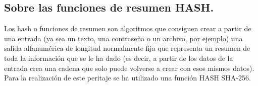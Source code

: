 \subsection{Sobre las funciones de resumen HASH.}
Los hash o funciones de resumen son algoritmos que consiguen crear a partir de una entrada (ya sea un texto, una contraseña o un archivo, por ejemplo) una salida alfanumérica de longitud normalmente fija que representa un resumen de toda la información que se le ha dado (es decir, a partir de los datos de la entrada crea una cadena que solo puede volverse a crear con esos mismos datos). Para la realización de este peritaje se ha utilizado una función HASH SHA-256.
%
%
%
%
%
%
